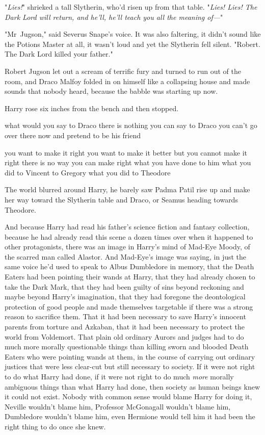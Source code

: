 "\emph{Lies!}" shrieked a tall Slytherin, who'd risen up from that table.
"\emph{Lies! Lies! The Dark Lord will return, and he'll, he'll teach you all
the meaning of---}"

"Mr~Jugson," said Severus Snape's voice. It was also faltering, it didn't
sound like the Potions Master at all, it wasn't loud and yet the Slytherin fell
silent. "Robert. The Dark Lord killed your father."

Robert Jugson let out a scream of terrific fury and turned to run out of the
room, and Draco Malfoy folded in on himself like a collapsing house and made
sounds that nobody heard, because the babble was starting up now.

Harry rose six inches from the bench and then stopped.

what would you say to Draco there is nothing you can say to Draco you can't go
over there now and pretend to be his friend

you want to make it right you want to make it better but you cannot make it
right there is no way you can make right what you have done to him what you did
to Vincent to Gregory what you did to Theodore

The world blurred around Harry, he barely saw Padma Patil rise up and make her
way toward the Slytherin table and Draco, or Seamus heading towards Theodore.

And because Harry had read his father's science fiction and fantasy collection,
because he had already read this scene a dozen times over when it happened to
other protagonists, there was an image in Harry's mind of Mad-Eye Moody, of the
scarred man called Alastor. And Mad-Eye's image was saying, in just the same
voice he'd used to speak to Albus Dumbledore in memory, that the Death Eaters
had been pointing their wands at Harry, that they had already chosen to take
the Dark Mark, that they had been guilty of sins beyond reckoning and maybe
beyond Harry's imagination, that they had foregone the deontological protection
of good people and made themselves targetable if there was a strong reason to
sacrifice them. That it had been necessary to save Harry's innocent parents
from torture and Azkaban, that it had been necessary to protect the world from
Voldemort. That plain old ordinary Aurors and judges had to do much more
morally questionable things than killing sworn and blooded Death Eaters who
were pointing wands at them, in the course of carrying out ordinary justices
that were less clear-cut but still necessary to society. If it were not right
to do what Harry had done, if it were not right to do much \emph{more} morally
ambiguous things than what Harry had done, then society as human beings knew it
could not exist. Nobody with common sense would blame Harry for doing it,
Neville wouldn't blame him, Professor McGonagall wouldn't blame him, Dumbledore
wouldn't blame him, even Hermione would tell him it had been the right thing to
do once she knew.

